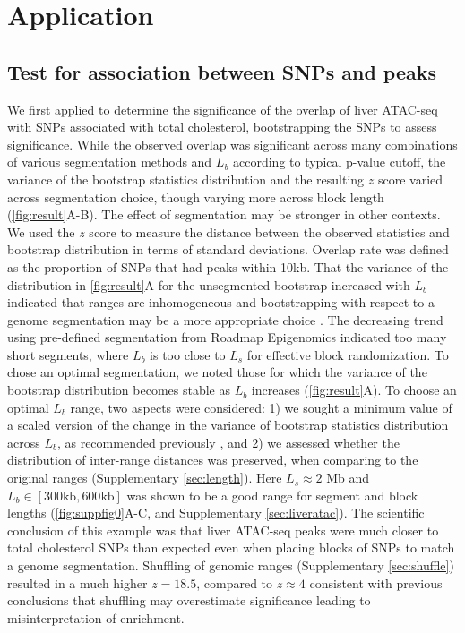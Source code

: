 \section{Application}
\subsection{Test for association between SNPs and peaks}

We first applied \bootranges to determine the significance of the
overlap of liver ATAC-seq
\citep{CURRIN20211169} with SNPs associated with total cholesterol,
bootstrapping the SNPs to assess significance.
While the observed overlap was significant across many combinations of
various segmentation methods and $L_b$ according to typical p-value cutoff,
the variance of the bootstrap statistics distribution 
and the resulting $z$ score varied across 
segmentation choice, though varying more across block length 
(\cref{fig:result}A-B). The effect of segmentation may be stronger 
in other contexts.
We used the $z$ score to measure the distance between the observed
statistics and bootstrap distribution in terms of standard deviations.
Overlap rate was defined as the proportion of
SNPs that had peaks within 10kb.
That the variance of the distribution in \cref{fig:result}A for the
unsegmented bootstrap increased with $L_b$ indicated that
ranges are inhomogeneous and
bootstrapping with respect to a genome
segmentation may be a more appropriate choice
\citep{bickel2010subsampling}. 
The decreasing trend using pre-defined segmentation from
Roadmap Epigenomics indicated too many short segments,
where $L_b$ is too close to $L_s$ for effective block randomization.
To chose an optimal segmentation, 
we noted those for which the variance of the bootstrap distribution 
becomes stable as $L_b$ increases (\cref{fig:result}A).
To choose an optimal $L_b$ range, two aspects were considered:
1) we sought a minimum value of a scaled version of the change 
in the variance of bootstrap statistics distribution across $L_b$, 
as recommended previously \citep{bickel2010subsampling},
and 2) we assessed whether the distribution of inter-range distances  
was preserved, when comparing to the original ranges 
(Supplementary \cref{sec:length}).
Here $L_s \approx 2$ Mb and $L_b \in [300\textrm{kb},600\textrm{kb}]$ was 
shown to be a good range for segment and block
lengths (\cref{fig:suppfig0}A-C, and Supplementary \cref{sec:liveratac}).
The scientific conclusion of this example was that liver ATAC-seq
peaks were
much closer to total cholesterol SNPs than expected even when placing
blocks of SNPs to match a genome segmentation. 
Shuffling of genomic ranges (Supplementary \cref{sec:shuffle})
resulted in a much higher $z = 18.5$, compared to $z \approx 4$ 
consistent with previous conclusions that shuffling may 
overestimate significance leading to misinterpretation of enrichment.


